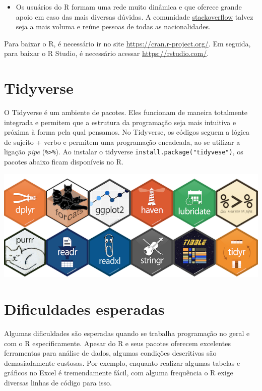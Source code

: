 \documentclass[
]{book}
\providecommand{\tightlist}{%
  \setlength{\itemsep}{0pt}\setlength{\parskip}{0pt}}
\begin{document}
\begin{itemize}
  \begin{itemize}
  \tightlist
  \item
    Os usuários do R formam uma rede muito dinâmica e que oferece grande apoio em caso das mais diversas dúvidas. A comunidade \href{https://stackoverflow.com/}{stackoverflow} talvez seja a mais voluma e reúne pessoas de todas as nacionalidades.
  \end{itemize}
\end{itemize}

Para baixar o R, é necessário ir no site \url{https://cran.r-project.org/}. Em seguida, para baixar o R Studio, é necessário acessar \url{https://rstudio.com/}.

\hypertarget{tidyverse}{%
\section{Tidyverse}\label{tidyverse}}

O Tidyverse é um ambiente de pacotes. Eles funcionam de maneira totalmente integrada e permitem que a estrutura da programação seja mais intuitiva e próxima à forma pela qual pensamos. No Tidyverse, os códigos seguem a lógica de sujeito + verbo e permitem uma programação encadeada, ao se utilizar a ligação \emph{pipe} (\texttt{\%\textgreater{}\%}). Ao instalar o tidyverse \texttt{install.package("tidyvese")}, os pacotes abaixo ficam disponíveis no R.

\includegraphics{./img/tidyverse_website.PNG}

\hypertarget{dificuldades-esperadas}{%
\section{Dificuldades esperadas}\label{dificuldades-esperadas}}

Algumas dificuldades são esperadas quando se trabalha programação no geral e com o R especificamente. Apesar do R e seus pacotes oferecem excelentes ferramentas para análise de dados, algumas condições descritivas são demasiadamente custosas. Por exemplo, enquanto realizar algumas tabelas e gráficos no Excel é tremendamente fácil, com alguma frequência o R exige diversas linhas de código para isso.
\end{document}
